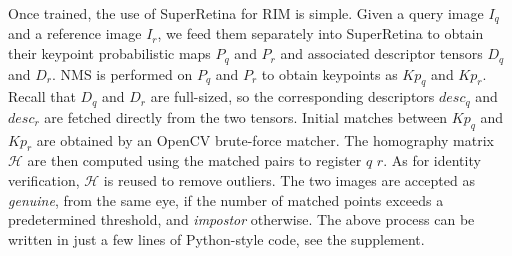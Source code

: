 Once trained, the use of SuperRetina for RIM is simple. Given a query image $I_q$ and a reference image $I_r$, we feed them separately into SuperRetina to obtain their keypoint probabilistic maps $P_q$ and $P_r$ and associated descriptor tensors $D_q$ and $D_r$. NMS is performed on $P_q$ and $P_r$ to obtain keypoints as $Kp_q$ and $Kp_r$. Recall that $D_q$ and $D_r$ are full-sized, so the corresponding descriptors $desc_q$ and $desc_r$ are fetched directly from the two tensors. Initial matches between $Kp_q$ and $Kp_r$ are obtained by an OpenCV brute-force matcher. The homography matrix $\mathcal{H}$ are then computed using the matched pairs to register $q$ \wrt $r$. As for identity verification, $\mathcal{H}$ is reused to remove outliers. The two images are accepted as \emph{genuine}, \ie from the same eye, if the number of matched points exceeds a predetermined threshold, and \emph{impostor} otherwise. The above process can be written in just a few lines of Python-style code, see the supplement. 

